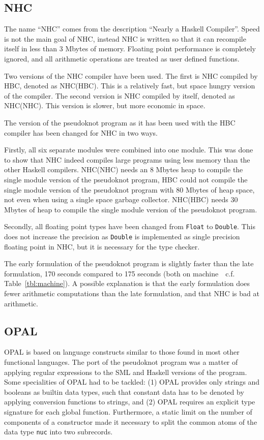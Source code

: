 \subsection{NHC}
\label{sec:NHC}
The name ``NHC'' comes from the description ``Nearly a Haskell
Compiler''. Speed is not the main goal of NHC, instead NHC is written
so that it can recompile itself in less than 3 Mbytes of memory.
Floating point performance is completely ignored, and all arithmetic
operations are treated as user defined functions.

Two versions of the NHC compiler have been used. The first is NHC
compiled by HBC, denoted as NHC(HBC). This is a relatively fast, but
space hungry version of the compiler. The second version is NHC
compiled by itself, denoted as NHC(NHC). This version is slower, but
more economic in space.

The version of the pseudoknot program as it has been used with the HBC
compiler has been changed for NHC in two ways.

Firstly, all six separate modules were combined into one module. This
was done to show that NHC indeed compiles large programs using less
memory than the other Haskell compilers. NHC(NHC) needs an 8 Mbytes heap
to compile the single module version of the pseudoknot program, HBC
could not compile the single module version of the pseudoknot program
with 80 Mbytes of heap space, not even when using a single space garbage
collector. NHC(HBC) needs 30 Mbytes of heap to compile the single module
version of the pseudoknot program.

Secondly, all floating point types have been changed from \verb=Float=
to \verb=Double=. This does not increase the precision as \verb=Double=
is implemented as single precision floating point in NHC, but it is
necessary for the type checker.

The early formulation of the pseudoknot program is slightly faster
than the late formulation, 170 seconds compared to 175 seconds (both
on machine~\syschalmers~c.f. Table~\ref{tbl:machine}). A possible
explanation is that the early formulation does fewer arithmetic
computations than the late formulation, and that NHC is bad at
arithmetic.

\subsection{OPAL}
\label{sec:OPAL}
OPAL is based on language constructs similar to those found in most
other functional languages. The port of the pseudoknot program was a
matter of applying regular expressions to the SML and Haskell versions
of the program. Some specialities of OPAL
had to be tackled: (1) OPAL provides only strings and booleans as
builtin data types, such that constant data has to be denoted by
applying conversion functions to strings, and (2) OPAL requires an
explicit type signature for each global function. Furthermore, a static
limit on the number of components of a constructor made it necessary to
split the common atoms of the data type \verb=nuc= into two subrecords.

